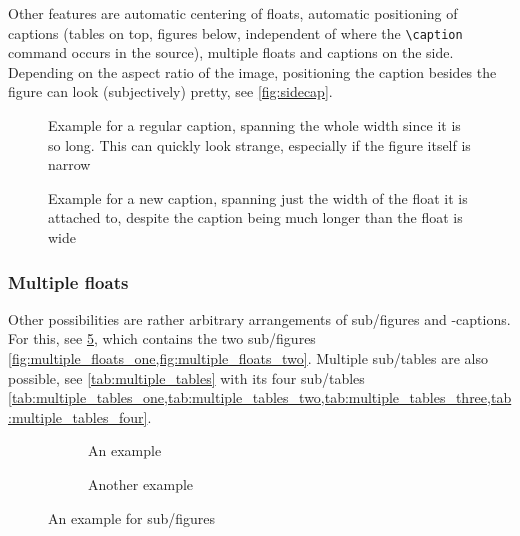 \begin{description}
          Other features are automatic centering of floats, automatic positioning
          of captions (tables on top, figures below, independent of where the
          \verb|\caption| command occurs in the source), multiple floats and
          captions on the side.
          Depending on the aspect ratio of the image, positioning the caption besides
          the figure can look (subjectively) pretty, see \cref{fig:sidecap}.
\end{description}

\begin{figure}[tbp]
\ContinuedFloat*%
    \centering
    
    \captionsetup{width=\linewidth}
    \caption{%
        Example for a regular caption,
        spanning the whole width since it is so long.
        This can quickly look strange, especially if the figure itself is narrow%
    }
    \label{fig:wide_caption}
\end{figure}

\begin{figure}[tbp]
\ContinuedFloat
    \centering
    
    \captionsetup{width=0.45\linewidth}
    \caption{%
        Example for a new caption, spanning just the width of the float
        it is attached to, despite the caption being much longer than the
        float is wide%
    }
    \label{fig:tighter_caption}
\end{figure}

\subsubsection{Multiple floats}

Other possibilities are rather arbitrary arrangements of sub\-/figures and -captions.
For this, see \cref{fig:multiple_floats}, which contains the two sub\-/figures
\cref{fig:multiple_floats_one,fig:multiple_floats_two}.
Multiple sub\-/tables are also possible, see \cref{tab:multiple_tables} with its four
sub\-/tables
\cref{tab:multiple_tables_one,tab:multiple_tables_two,tab:multiple_tables_three,tab:multiple_tables_four}.

\begin{figure}[tbp]

    \begin{subfigure}[t]{0.48\linewidth}
        \centering
        
        \caption{An example}
        \label{fig:multiple_floats_one}
    \end{subfigure}
    \hfill
    \begin{subfigure}[t]{0.48\linewidth}
        \centering
        
        \caption{Another example}
        \label{fig:multiple_floats_two}
    \end{subfigure}
    \caption{An example for sub\-/figures}
    \label{fig:multiple_floats}
\end{figure}

